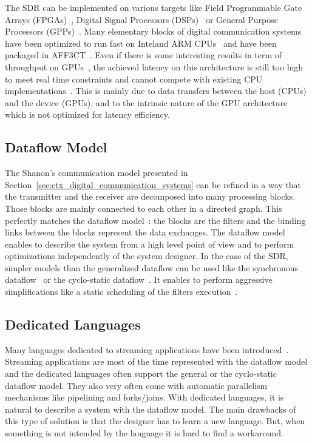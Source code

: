 The SDR can be implemented on various targets like Field Programmable Gate
Arrays (FPGAs)~\cite{Coulton2004,Skey2006,Dutta2010,Shaik2013,Maheshwarappa2015,
Nivin2016}, Digital Signal Processors (DSPs)~\cite{Kaur2008,Karlsson2013,
Shaik2013} or General Purpose Processors (GPPs)~\cite{Yoge2012,Bang2014,
Meshram2019,Grayver2020}. Many elementary blocks of digital communication
systems have been optimized to run fast on Intel\R and ARM\R
CPUs~\cite{Cassagne2015c,Cassagne2016a,Cassagne2016b,Cassagne2018,Leonardon2019,
Ghaffari2019} and have been packaged in AFF3CT~\cite{Cassagne2017a,
Cassagne2019a}. Even if there is some interesting results in term of throughput
on GPUs~\cite{Xianjun2013,Li2014,LeGal2014a,Giard2016b,Keskin2017a}, the
achieved latency on this architecture is still too high to meet real time
constraints and cannot compete with existing CPU
implementations~\cite{LeGal2015a,Cassagne2015c,Giard2016b,Cassagne2016a,
LeGal2017,Leonardon2019,LeGal2019a}. This is mainly due to data transfers
between the host (CPUs) and the device (GPUs), and to the intrinsic nature of
the GPU architecture which is not optimized for latency efficiency.

\subsection{Dataflow Model}

The Shanon's communication model presented in
Section~\ref{sec:ctx_digital_communication_systems} can be refined in a way
that the transmitter and the receiver are decomposed into many processing
blocks. Those blocks are mainly connected to each other in a directed graph.
This perfectly matches the dataflow model~\cite{Dennis1980,Ackerman1982}: the
blocks are the filters and the binding links between the blocks represent the
data exchanges. The dataflow model enables to describe the system from a high
level point of view and to perform optimizations independently of the system
designer. In the case of the SDR, simpler models than the generalized dataflow
can be used like the synchronous dataflow~\cite{Lee1987} or the cyclo-static
dataflow~\cite{Engels1994,Bilsen1995}. It enables to perform aggressive
simplifications like a static scheduling of the filters
execution~\cite{Parks1995}.

\subsection{Dedicated Languages}

Many languages dedicated to streaming applications have been
introduced~\cite{Buck2004,Amarasinghe2005,Liao2006,Black-Schaffer2010,
Glitia2010,Thies2010,DeOliveiraCastro2017}. Streaming applications are most of
the time represented with the dataflow model and the dedicated languages often
support the general or the cyclo-static dataflow model. They also very often
come with automatic parallelism mechanisms like pipelining and forks/joins. With
dedicated languages, it is natural to describe a system with the dataflow model.
The main drawbacks of this type of solution is that the designer has to learn a
new language. But, when something is not intended by the language it is hard to
find a workaround.

